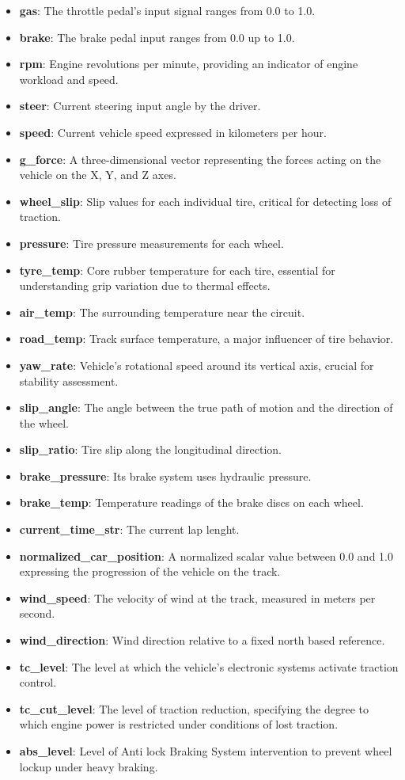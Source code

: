 \documentclass[a4paper,final,12pt]{report}
\begin{document}
\begin{itemize}
    \item \textbf{gas}: The throttle pedal's input signal ranges from 0.0 to 1.0.
    \item \textbf{brake}: The brake pedal input ranges from 0.0 up to 1.0.
    \item \textbf{rpm}: Engine revolutions per minute, providing an indicator of engine workload and speed.
    \item \textbf{steer}: Current steering input angle by the driver.
    \item \textbf{speed}: Current vehicle speed expressed in kilometers per hour.
    \item \textbf{g\_force}: A three-dimensional vector representing the forces acting on the vehicle on the X, Y, and Z axes.
    \item \textbf{wheel\_slip}: Slip values for each individual tire, critical for detecting loss of traction.
    \item \textbf{pressure}: Tire pressure measurements for each wheel.
    \item \textbf{tyre\_temp}: Core rubber temperature for each tire, essential for understanding grip variation due to thermal effects.
    \item \textbf{air\_temp}: The surrounding temperature near the circuit.
    \item \textbf{road\_temp}: Track surface temperature, a major influencer of tire behavior.
    \item \textbf{yaw\_rate}: Vehicle’s rotational speed around its vertical axis, crucial for stability assessment.
    \item \textbf{slip\_angle}: The angle between the true path of motion and the direction of the wheel.
    \item \textbf{slip\_ratio}: Tire slip along the longitudinal direction.
    \item \textbf{brake\_pressure}: Its brake system uses hydraulic pressure.
    \item \textbf{brake\_temp}: Temperature readings of the brake discs on each wheel.
    \item \textbf{current\_time\_str}: The current lap lenght.
    \item \textbf{normalized\_car\_position}: A normalized scalar value between 0.0 and 1.0 expressing the progression of the vehicle on the track.
    \item \textbf{wind\_speed}: The velocity of wind at the track, measured in meters per second.
    \item \textbf{wind\_direction}: Wind direction relative to a fixed north based reference.
    \item \textbf{tc\_level}: The level at which the vehicle's electronic systems activate traction control.
    \item \textbf{tc\_cut\_level}: The level of traction reduction, specifying the degree to which engine power is restricted under conditions of lost traction.
    \item \textbf{abs\_level}: Level of Anti lock Braking System intervention to prevent wheel lockup under heavy braking.


\end{itemize}
\end{document}
